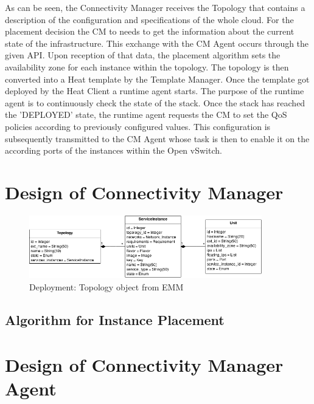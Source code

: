As can be seen, the Connectivity Manager receives the Topology that contains a description of the configuration and specifications of the whole cloud. For the placement decision the CM to needs to get the information about the current state of the infrastructure. This exchange with the CM Agent occurs through the given API. Upon reception of that data, the placement algorithm sets the availability zone for each instance within the topology. The topology is then converted into a Heat template by the Template Manager. Once the template got deployed by the Heat Client a runtime agent starts. The purpose of the runtime agent is to continuously check the state of the stack. Once the stack has reached the 'DEPLOYED' state, the runtime agent requests the CM to set the QoS policies according to previously configured values. This configuration is subsequently transmitted to the CM Agent whose task is then to enable it on the according ports of the instances within the Open vSwitch.

\section{Design of Connectivity Manager}


\begin{figure}[H]
\centering

\includegraphics[width=0.9\textwidth]{images/design/cm_topology_object}

\caption{Deployment: Topology object from EMM}
\end{figure}


\subsection{Algorithm for Instance Placement}



\newpage
\section{Design of Connectivity Manager Agent}

